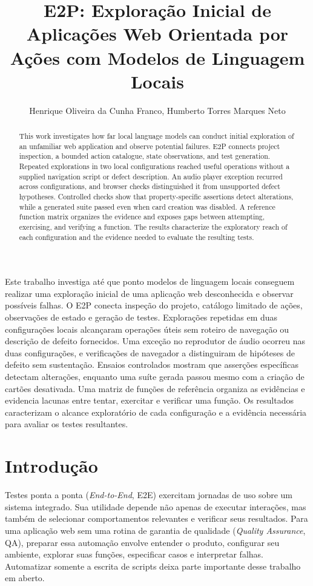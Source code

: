 \documentclass[12pt]{article}
\title{E2P: Exploração Inicial de Aplicações Web Orientada por Ações com Modelos de Linguagem Locais}
\author{Henrique Oliveira da Cunha Franco\inst{1}, Humberto Torres Marques Neto\inst{1}}
\begin{document}
\maketitle
\begin{otherlanguage}{english}
\begin{abstract}
This work investigates how far local language models can conduct initial exploration of an unfamiliar web application and observe potential failures. E2P connects project inspection, a bounded action catalogue, state observations, and test generation. Repeated explorations in two local configurations reached useful operations without a supplied navigation script or defect description. An audio player exception recurred across configurations, and browser checks distinguished it from unsupported defect hypotheses. Controlled checks show that property-specific assertions detect alterations, while a generated suite passed even when card creation was disabled. A reference function matrix organizes the evidence and exposes gaps between attempting, exercising, and verifying a function. The results characterize the exploratory reach of each configuration and the evidence needed to evaluate the resulting tests.
\end{abstract}
\end{otherlanguage}
\begin{resumo}
Este trabalho investiga até que ponto modelos de linguagem locais conseguem realizar uma exploração inicial de uma aplicação web desconhecida e observar possíveis falhas. O E2P conecta inspeção do projeto, catálogo limitado de ações, observações de estado e geração de testes. Explorações repetidas em duas configurações locais alcançaram operações úteis sem roteiro de navegação ou descrição de defeito fornecidos. Uma exceção no reprodutor de áudio ocorreu nas duas configurações, e verificações de navegador a distinguiram de hipóteses de defeito sem sustentação. Ensaios controlados mostram que asserções específicas detectam alterações, enquanto uma suíte gerada passou mesmo com a criação de cartões desativada. Uma matriz de funções de referência organiza as evidências e evidencia lacunas entre tentar, exercitar e verificar uma função. Os resultados caracterizam o alcance exploratório de cada configuração e a evidência necessária para avaliar os testes resultantes.
\end{resumo}

\section{Introdução}\label{sec:intro}
Testes ponta a ponta (\textit{End-to-End}, E2E) exercitam jornadas de uso sobre um sistema integrado. Sua utilidade depende não apenas de executar interações, mas também de selecionar comportamentos relevantes e verificar seus resultados. Para uma aplicação web sem uma rotina de garantia de qualidade (\textit{Quality Assurance}, QA), preparar essa automação envolve entender o produto, configurar seu ambiente, explorar suas funções, especificar casos e interpretar falhas. Automatizar somente a escrita de scripts deixa parte importante desse trabalho em aberto.
\end{document}
